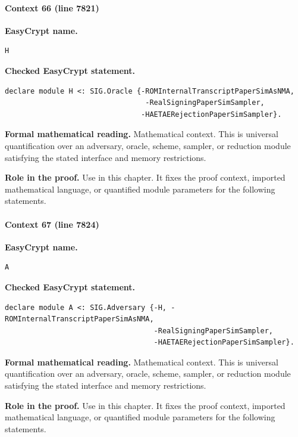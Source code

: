 \paragraph{Context 66 (line 7821)}
\noindent\textbf{EasyCrypt name.}
\begin{lstlisting}[language=EasyCrypt,basicstyle=\ttfamily\scriptsize]
H
\end{lstlisting}
\noindent\textbf{Checked EasyCrypt statement.}
\begin{lstlisting}[language=EasyCrypt,basicstyle=\ttfamily\scriptsize]
declare module H <: SIG.Oracle {-ROMInternalTranscriptPaperSimAsNMA,
                                 -RealSigningPaperSimSampler,
                                -HAETAERejectionPaperSimSampler}.
\end{lstlisting}
\noindent\textbf{Formal mathematical reading.}
Mathematical context. This is universal quantification over an adversary, oracle, scheme, sampler, or reduction module satisfying the stated interface and memory restrictions.

\noindent\textbf{Role in the proof.}
Use in this chapter. It fixes the proof context, imported mathematical language, or quantified module parameters for the following statements.

\paragraph{Context 67 (line 7824)}
\noindent\textbf{EasyCrypt name.}
\begin{lstlisting}[language=EasyCrypt,basicstyle=\ttfamily\scriptsize]
A
\end{lstlisting}
\noindent\textbf{Checked EasyCrypt statement.}
\begin{lstlisting}[language=EasyCrypt,basicstyle=\ttfamily\scriptsize]
declare module A <: SIG.Adversary {-H, -ROMInternalTranscriptPaperSimAsNMA,
                                   -RealSigningPaperSimSampler,
                                   -HAETAERejectionPaperSimSampler}.
\end{lstlisting}
\noindent\textbf{Formal mathematical reading.}
Mathematical context. This is universal quantification over an adversary, oracle, scheme, sampler, or reduction module satisfying the stated interface and memory restrictions.

\noindent\textbf{Role in the proof.}
Use in this chapter. It fixes the proof context, imported mathematical language, or quantified module parameters for the following statements.

